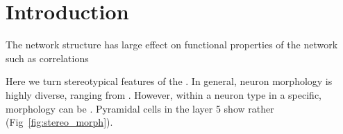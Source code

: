\clearpage
\pagebreak
\newpage
\section*{Introduction}

The network structure has large effect on functional properties of the network such as correlations \cite{Pernice2011}








Here we turn stereotypical features of the . In general, neuron morphology is highly diverse, ranging from . However, within a neuron type in a specific, morphology can be . Pyramidal cells in the layer 5 show rather  (Fig~\ref{fig:stereo_morph}).







